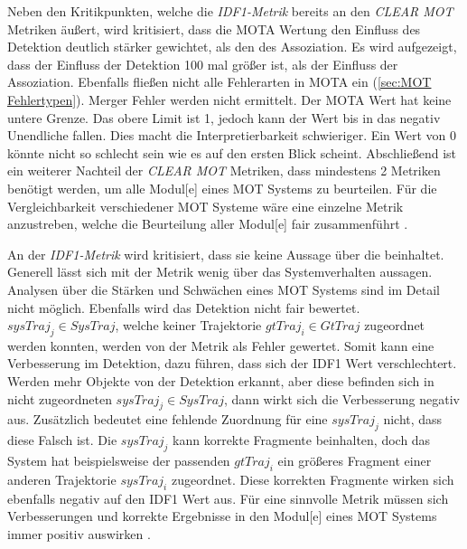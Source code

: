 Neben den Kritikpunkten, welche die \textit{\gls{IDF1}-Metrik} bereits an den \textit{\acrshort{CLEAR} \gls{MOT}} Metriken äußert, wird kritisiert, dass die \gls{MOTA} Wertung den Einfluss des \gls{Detektion} deutlich stärker gewichtet, als den des \gls{Assoziation}. Es wird aufgezeigt, dass der Einfluss der \gls{Detektion} 100 mal größer ist, als der Einfluss der \gls{Assoziation}. Ebenfalls fließen nicht alle Fehlerarten in \gls{MOTA} ein (\autoref{sec:MOT Fehlertypen}). Merger Fehler werden nicht ermittelt. Der \gls{MOTA} Wert hat keine untere Grenze. Das obere Limit ist 1, jedoch kann der Wert bis in das negativ Unendliche fallen. Dies macht die Interpretierbarkeit schwieriger. Ein Wert von 0 könnte nicht so schlecht sein wie es auf den ersten Blick scheint. Abschließend ist ein weiterer Nachteil der \textit{\acrshort{CLEAR} \gls{MOT}} Metriken, dass mindestens 2 Metriken benötigt werden, um  alle \gls{Modul}[e] eines \gls{MOT} Systems zu beurteilen. Für die Vergleichbarkeit verschiedener \gls{MOT} Systeme wäre eine einzelne Metrik anzustreben, welche die Beurteilung aller \gls{Modul}[e] fair zusammenführt \cite{HOTA}.\par

An der \textit{\gls{IDF1}-Metrik} wird kritisiert, dass sie keine Aussage über die  beinhaltet. Generell lässt sich mit der Metrik wenig über das Systemverhalten aussagen. Analysen über die Stärken und Schwächen eines \gls{MOT} Systems sind im Detail nicht möglich. Ebenfalls wird das \gls{Detektion} nicht fair bewertet. \(sysTraj_j \in SysTraj\), welche keiner \gls{Trajektorie} \(gtTraj_i \in GtTraj\) zugeordnet werden konnten, werden von der Metrik als Fehler gewertet. Somit kann eine Verbesserung im \gls{Detektion}, dazu führen, dass sich der \gls{IDF1} Wert verschlechtert. Werden mehr Objekte von der \gls{Detektion} erkannt, aber diese befinden sich in nicht zugeordneten \(sysTraj_j \in SysTraj\), dann wirkt sich die Verbesserung negativ aus. Zusätzlich bedeutet eine fehlende Zuordnung für eine \(sysTraj_j\) nicht, dass diese Falsch ist. Die \(sysTraj_j\) kann korrekte Fragmente beinhalten, doch das System hat beispielsweise der passenden \(gtTraj_i\) ein größeres Fragment einer anderen \gls{Trajektorie} \(sysTraj_i\) zugeordnet. Diese korrekten Fragmente wirken sich ebenfalls negativ auf den \gls{IDF1} Wert aus. Für eine sinnvolle Metrik müssen sich Verbesserungen und korrekte Ergebnisse in den \gls{Modul}[e] eines \gls{MOT} Systems immer positiv auswirken \cite{HOTA}. \par

